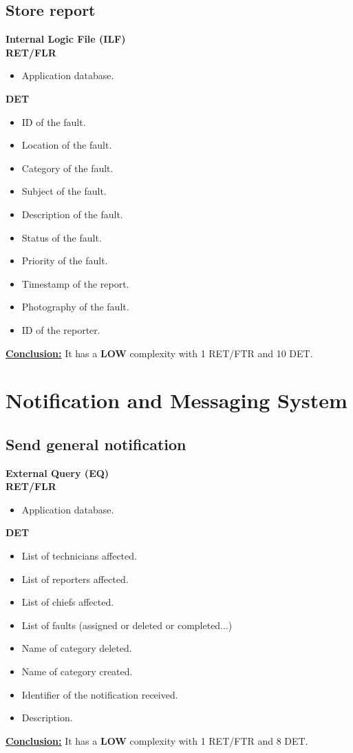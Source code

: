 \subsection{Store report}
\textbf{Internal Logic File (ILF)} \\ 
\textbf{RET/FLR}
\begin{itemize}
\item Application database.
\end{itemize}
\textbf{DET}
\begin{itemize}
\item ID of the fault.
\item Location of the fault.
\item Category of the fault.
\item Subject of the fault.
\item Description of the fault.
\item Status of the fault.
\item Priority of the fault.
\item Timestamp of the report.
\item Photography of the fault.
\item ID of the reporter.
\end{itemize}
\textbf{\underline{Conclusion:}} It has a \textbf{LOW} complexity with 1 RET/FTR and 10 DET.


\section{Notification and Messaging System}

\subsection{Send general notification}
\textbf{External Query (EQ)} \\ 
\textbf{RET/FLR}
\begin{itemize}
\item Application database.
\end{itemize}
\textbf{DET}
\begin{itemize}
\item List of technicians affected.
\item List of reporters affected.
\item List of chiefs affected.
\item List of faults (assigned or deleted or completed...)
\item Name of category deleted.
\item Name of category created.
\item Identifier of the notification received.
\item Description.
\end{itemize}
\textbf{\underline{Conclusion:}} It has a \textbf{LOW} complexity with 1 RET/FTR and 8 DET.


